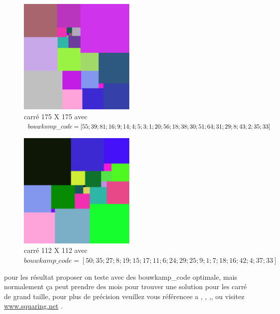 \documentclass{article}
\begin{document}
\begin{figure}[htbp]
  \centering
  
  \includegraphics[width=0.5\textwidth]{image/175-175.png}
  \caption{carré 175 X 175 avec $bouwkamp\_code = [55;39;81;16;9;14;4;5;3;1;20;56;18;38;30;51;64;31;29;8;43\newline;2;35;33]$}
  \label{fig6}

\end{figure}


\begin{figure}[htbp]
  \centering
  
  \includegraphics[width=0.5\textwidth]{image/112-112.png}
  \caption{carré 112 X 112 avec $bouwkamp\_code = [50;35;27;8;19;15;17;11;6;24;29;25;9;1;7;18;16;42;4;37;33]$}
  \label{fig7}

\end{figure}


pour les résultat proposer on teste avec des bouwkamp\_code optimale, mais normalement ça peut prendre des mois pour trouver une solution pour les carré de grand taille, pour plus de précision veuillez vous référencee a \citet{Gambini1999}, \citet{bouwkamp_dissection} ,\citet{bouwkamp_catalogue_simple} ,\citet{bouwkamp_catalogue_perfect}, ou visitez \href{http://www.squaring.net/}{www.squaring.net} .
\end{document}
